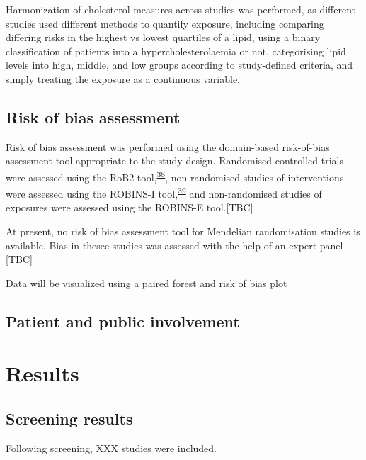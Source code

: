\documentclass[a4paper, twoside]{templates/ociamthesis}
\begin{document}
Harmonization of cholesterol measures across studies was performed, as different studies used different methods to quantify exposure, including comparing differing risks in the highest vs lowest quartiles of a lipid, using a binary classification of patients into a hypercholesterolaemia or not, categorising lipid levels into high, middle, and low groups according to study-defined criteria, and simply treating the exposure as a continuous variable.

\hypertarget{risk-of-bias-assessment}{%
\subsection{Risk of bias assessment}\label{risk-of-bias-assessment}}

Risk of bias assessment was performed using the domain-based risk-of-bias assessment tool appropriate to the study design. Randomised controlled trials were assessed using the RoB2 tool,\textsuperscript{\protect\hyperlink{ref-sterne2019}{38}}, non-randomised studies of interventions were assessed using the ROBINS-I tool,\textsuperscript{\protect\hyperlink{ref-sterne2016}{39}} and non-randomised studies of exposures were assessed using the ROBINS-E tool.{[}TBC{]}

At present, no risk of bias assessment tool for Mendelian randomisation studies is available. Bias in thesee studies was assessed with the help of an expert panel {[}TBC{]}

Data will be visualized using a paired forest and risk of bias plot

\hypertarget{patient-and-public-involvement}{%
\subsection{Patient and public involvement}\label{patient-and-public-involvement}}

\hypertarget{results}{%
\section{Results}\label{results}}

\hypertarget{screening-results}{%
\subsection{Screening results}\label{screening-results}}

Following screening, XXX studies were included.
\end{document}
